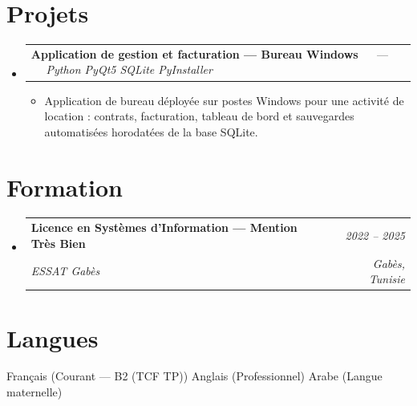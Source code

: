 \documentclass[letterpaper,9pt]{article}
\makeatletter
\newcommand{\resumeItem}[1]{\item\small{#1}}
\newcommand{\resumeSubheading}[4]{
  \vspace{-1pt}\item
  \begin{tabular*}{0.97\textwidth}[t]{l@{\extracolsep{\fill}}r}
    \textbf{#1} & \textit{\color{greytext}#2} \\
    \textit{\small\color{greytext} #3} & \textit{\small\color{greytext} #4}
  \end{tabular*}\vspace{-2pt}
}
\newcommand{\resumeProjectHeading}[2]{
  \item
  \begin{tabular*}{0.97\textwidth}{l@{\extracolsep{\fill}}r}
    \small #1 & #2
  \end{tabular*}\vspace{-1pt}
}
\newcommand{\resumeSubHeadingListStart}{\begin{itemize}[leftmargin=0.18in, label={}, itemsep=1.2pt, topsep=2.5pt, parsep=0pt]}
\newcommand{\resumeSubHeadingListEnd}{\end{itemize}\vspace{-2pt}}
\newcommand{\resumeProjectListStart}{\begin{itemize}[leftmargin=0.24in, label={}, itemsep=0.9pt, topsep=1.2pt, parsep=0pt]}
\newcommand{\resumeProjectListEnd}{\end{itemize}\vspace{-2pt}}
\makeatother
\begin{document}
\section{Projets}
\resumeSubHeadingListStart

  \resumeProjectHeading{\textbf{Application de gestion et facturation --- Bureau Windows} $\quad$ --- $\quad$ \emph{\color{greytext}Python \textperiodcentered{} PyQt5 \textperiodcentered{} SQLite \textperiodcentered{} PyInstaller}}{}
    \resumeProjectListStart
      \resumeItem{Application de bureau déployée sur postes Windows pour une activité de location : contrats, facturation, tableau de bord et sauvegardes automatisées horodatées de la base SQLite.}
    \resumeProjectListEnd

\resumeSubHeadingListEnd\vspace{-3pt}

\section{Formation}
\resumeSubHeadingListStart
  \resumeSubheading{Licence en Systèmes d'Information --- Mention Très Bien}{2022 -- 2025}{ESSAT Gabès}{Gabès, Tunisie}
\resumeSubHeadingListEnd\vspace{-1pt}

\section{Langues}
\begin{itemize}[leftmargin=0.18in, label={}, topsep=2pt, itemsep=1pt, parsep=0pt]
\footnotesize{
  \item Français (Courant --- B2 (TCF TP)) \textperiodcentered{} Anglais (Professionnel) \textperiodcentered{} Arabe (Langue maternelle)
}
\end{itemize}
\end{document}
